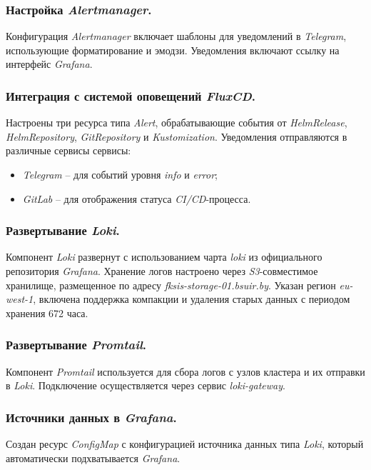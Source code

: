 \subsubsection{Настройка \textit{Alertmanager}.} Конфигурация \textit{Alertmanager} включает шаблоны для уведомлений в \textit{Telegram}, использующие форматирование и эмодзи. Уведомления включают ссылку на интерфейс \textit{Grafana}.

\subsubsection{Интеграция с системой оповещений \textit{FluxCD}.} Настроены три ресурса типа \textit{Alert}, обрабатывающие события от \textit{HelmRelease}, \textit{HelmRepository}, \textit{GitRepository} и \textit{Kustomization}. Уведомления отправляются в различные сервисы сервисы:

\begin{itemize}
    \item \textit{Telegram} -- для событий уровня \textit{info} и \textit{error};
    \item \textit{GitLab} -- для отображения статуса \textit{CI/CD}-процесса.
\end{itemize}

\subsubsection{Развертывание \textit{Loki}.} Компонент \textit{Loki} развернут с использованием чарта \textit{loki} из официального репозитория \textit{Grafana}. Хранение логов настроено через \textit{S3}-совместимое хранилище, размещенное по адресу \textit{fksis-storage-01.bsuir.by}. Указан регион \textit{eu-west-1}, включена поддержка компакции и удаления старых данных с периодом хранения 672 часа.

\subsubsection{Развертывание \textit{Promtail}.} Компонент \textit{Promtail} используется для сбора логов с узлов кластера и их отправки в \textit{Loki}. Подключение осуществляется через сервис \textit{loki-gateway}.

\subsubsection{Источники данных в \textit{Grafana}.} Создан ресурс \textit{ConfigMap} с конфигурацией источника данных типа \textit{Loki}, который автоматически подхватывается \textit{Grafana}.

